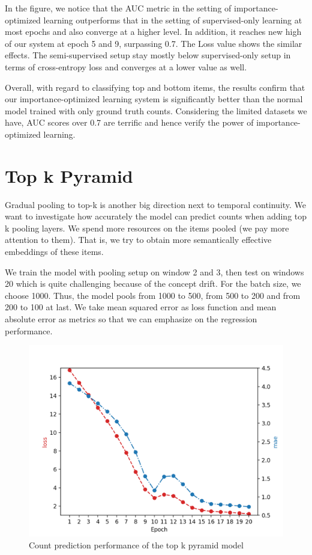 In the figure, we notice that the AUC metric in the setting of importance-optimized learning outperforms that in the setting of supervised-only learning at most epochs and also converge at a higher level. In addition, it reaches new high of our system at epoch 5 and 9, surpassing 0.7. 
The Loss value shows the similar effects. The semi-supervised setup stay mostly below supervised-only setup in terms of cross-entropy loss and converges at a lower value as well. 

Overall, with regard to classifying top and bottom items, the results confirm that our importance-optimized learning system is significantly better than the normal model trained with only ground truth counts. Considering the limited datasets we have, AUC scores over 0.7 are terrific and hence verify the power of importance-optimized learning.

\section{Top k Pyramid}

Gradual pooling to top-k is another big direction next to temporal continuity. We want to investigate how accurately the model can predict counts when adding top k pooling layers. We spend more resources on the items pooled (we pay more attention to them). That is, we try to obtain more semantically effective embeddings of these items.


We train the model with pooling setup on window 2 and 3, then test on windows 20 which is quite challenging because of the concept drift. For the batch size, we choose 1000. Thus, the model pools from 1000 to 500, from 500 to 200 and from 200 to 100 at last. We take mean squared error as loss function and mean absolute error as metrics so that we can emphasize on the regression performance.


\begin{figure}[htbp!]
	\centering
	\includegraphics[width=0.6\linewidth]{images/plots/pyramid_performance.png}
	\caption{Count prediction performance of the top k pyramid model}
	\label{fig:pyramid_performance}
\end{figure}

